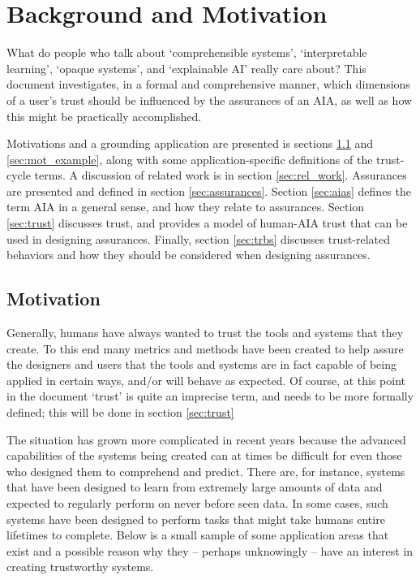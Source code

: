 \section{Background and Motivation} \label{sec:background}

What do people who talk about `comprehensible systems', `interpretable learning', `opaque systems', and `explainable AI' really care about? This document investigates, in a formal and comprehensive manner, which dimensions of a user's trust should be influenced by the assurances of an AIA, as well as how this might be practically accomplished.

Motivations and a grounding application are presented is sections \ref{sec:motivation} and \ref{sec:mot_example}, along with some application-specific definitions of the trust-cycle terms. A discussion of related work is in section \ref{sec:rel_work}. Assurances are presented and defined in section \ref{sec:assurances}.  Section \ref{sec:aias} defines the term AIA in a general sense, and how they relate to assurances. Section \ref{sec:trust} discusses trust, and provides a model of human-AIA trust that can be used in designing assurances. Finally, section \ref{sec:trbs} discusses trust-related behaviors and how they should be considered when designing assurances.

\subsection{Motivation} \label{sec:motivation}
    Generally, humans have always wanted to trust the tools and systems that they create.  To this end many metrics and methods have been created to help assure the designers and users that the tools and systems are in fact capable of being applied in certain ways, and/or will behave as expected. Of course, at this point in the document `trust' is quite an imprecise term, and needs to be more formally defined; this will be done in section \ref{sec:trust}

    The situation has grown more complicated in recent years because the advanced capabilities of the systems being created can at times be difficult for even those who designed them to comprehend and predict. There are, for instance, systems that have been designed to learn from extremely large amounts of data and expected to regularly perform on never before seen data. In some cases, such systems have been designed to perform tasks that might take humans entire lifetimes to complete. Below is a small sample of some application areas that exist and a possible reason why they -- perhaps unknowingly -- have an interest in creating trustworthy systems.


